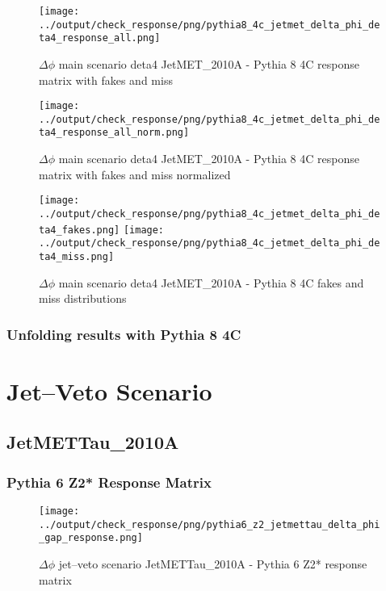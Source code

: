 \documentclass[11pt]{book}
\begin{document}
\begin{figure}[ht]
\centering
\texttt{[image: ../output/check\_response/png/pythia8\_4c\_jetmet\_delta\_phi\_deta4\_response\_all.png]}
\caption{$\Delta\phi$ main scenario deta4 JetMET\_2010A - Pythia 8 4C response matrix with fakes and miss}
\label{p8_jetmet_delta_phi_deta4_response_all}
\end{figure}

\begin{figure}[ht]
\centering
\texttt{[image: ../output/check\_response/png/pythia8\_4c\_jetmet\_delta\_phi\_deta4\_response\_all\_norm.png]}
\caption{$\Delta\phi$ main scenario deta4 JetMET\_2010A - Pythia 8 4C response matrix with fakes and miss normalized}
\label{p8_jetmet_delta_phi_deta4_response_all_norm}
\end{figure}

\begin{figure}[ht]
\centering
\texttt{[image: ../output/check\_response/png/pythia8\_4c\_jetmet\_delta\_phi\_deta4\_fakes.png]}
\texttt{[image: ../output/check\_response/png/pythia8\_4c\_jetmet\_delta\_phi\_deta4\_miss.png]}
\caption{$\Delta\phi$ main scenario deta4 JetMET\_2010A - Pythia 8 4C fakes and miss distributions}
\label{p8_jetmet_delta_phi_deta4_fakesmiss}
\end{figure}


\clearpage
\subsection{Unfolding results with Pythia 8 4C}



\newpage
\chapter{Jet--Veto Scenario}
\section{JetMETTau\_2010A}
\subsection{Pythia 6 Z2* Response Matrix}

\begin{figure}[ht]
\centering
\texttt{[image: ../output/check\_response/png/pythia6\_z2\_jetmettau\_delta\_phi\_gap\_response.png]}
\caption{$\Delta\phi$ jet--veto scenario JetMETTau\_2010A - Pythia 6 Z2* response matrix}
\label{p6_jetmettau_delta_phi_gap_response}
\end{figure}
\end{document}
